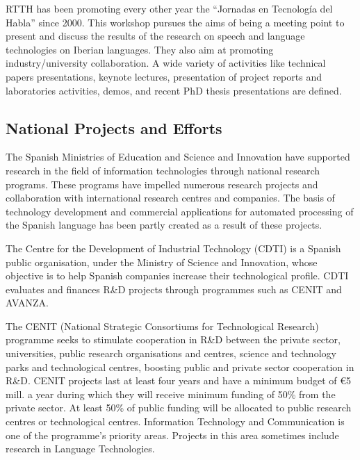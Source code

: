 \begin{multicols}{2}
RTTH has been promoting every other year the “Jornadas en Tecnología del Habla” since 2000. This workshop pursues the aims of being a meeting point to present and discuss the results of the research on speech and language technologies on Iberian languages. They also aim at promoting industry/university collaboration. A wide variety of activities like technical papers presentations, keynote lectures, presentation of project reports and laboratories activities, demos, and recent PhD thesis presentations are defined.

\subsection{National Projects and Efforts}

    The Spanish Ministries of Education and Science and Innovation have supported research in the field of information technologies through national research programs. These programs have impelled numerous research projects and collaboration with international research centres and companies. The basis of technology development and commercial applications for automated processing of the Spanish language has been partly created as a result of these projects.

The Centre for the Development of Industrial Technology (CDTI) is a Spanish public organisation, under the Ministry of Science and Innovation, whose objective is to help Spanish companies increase their technological profile. CDTI evaluates and finances R\&D projects through programmes such as CENIT and AVANZA.

The CENIT (National Strategic Consortiums for Technological Research) programme seeks to stimulate cooperation in R\&D between the private sector, universities, public research organisations and centres, science and technology parks and technological centres, boosting public and private sector cooperation in R\&D. CENIT projects last at least four years and have a minimum budget of €5 mill. a year during which they will receive minimum funding of 50\% from the private sector. At least 50\% of public funding will be allocated to public research centres or technological centres. Information Technology and Communication is one of the programme’s priority areas. Projects in this area sometimes include research in Language Technologies. 


\end{multicols}
